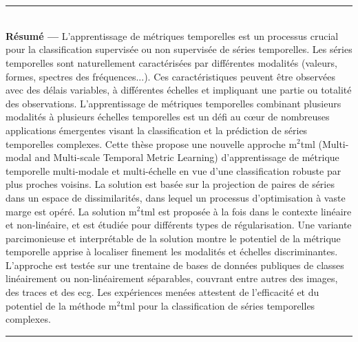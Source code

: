 \chapter*{}
\thispagestyle{empty}
\noindent\rule[2pt]{\textwidth}{0.5pt}
\\
{\large\textbf{Résumé ---}}
	L'apprentissage de métriques temporelles est un processus crucial pour la classification supervisée ou non supervisée de séries temporelles. Les séries temporelles sont naturellement caractérisées par différentes modalités (valeurs, formes, spectres des fréquences...). Ces caractéristiques peuvent être observées avec des délais variables, à différentes échelles et impliquant une partie ou totalité des observations. L'apprentissage de métriques temporelles combinant plusieurs modalités à plusieurs échelles temporelles est un défi au cœur de nombreuses applications émergentes visant la classification et la prédiction de séries temporelles complexes. Cette thèse propose une nouvelle approche {\sc m}$^2${\sc tml} (Multi-modal and Multi-scale Temporal Metric Learning) d'apprentissage de métrique temporelle multi-modale et multi-échelle en vue d'une classification robuste par plus proches voisins. La solution est basée sur la projection de paires de séries dans un espace de dissimilarités, dans lequel un processus d'optimisation à vaste marge est opéré. La solution {\sc m}$^2${\sc tml} est proposée à la fois dans le contexte linéaire et non-linéaire, et est étudiée pour différents types de régularisation. Une variante parcimonieuse et interprétable de la solution montre le potentiel de la métrique temporelle apprise à localiser finement les modalités et échelles discriminantes. L'approche est testée sur une trentaine de bases de données publiques de classes linéairement ou non-linéairement séparables, couvrant entre autres des images, des traces et des {\sc ecg}. Les expériences menées attestent de l'efficacité et du potentiel de la méthode {\sc m}$^2${\sc tml} pour la classification de séries temporelles complexes. 
\\
\noindent\rule[2pt]{\textwidth}{0.5pt}



\newpage
\thispagestyle{empty}

